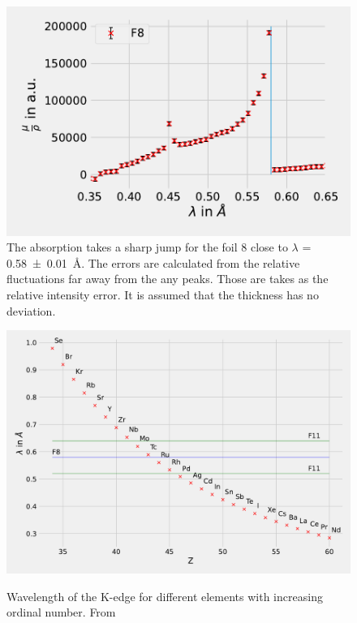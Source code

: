 \begin{figure}[h]
    \centering
    \includegraphics[width = 12cm]{Programming/Absorption/F8Kedge.pdf}
    \caption{The absorption takes a sharp jump for the foil 8 close to $\lambda$ = \SI{0.58\pm0.01}{\angstrom}. The errors are calculated from the  relative fluctuations far away from the any peaks. Those are takes as the relative intensity error. It is assumed that the thickness has no deviation.}
    \label{fig:F8edge}
\end{figure}


\begin{figure}[ht]
    \centering
    \includegraphics[angle = 90, width = 0.95\linewidth]{Programming/Absorption/Elements.pdf}
    \label{fig:Elements}
    \caption{Wavelength of the K-edge for different elements with increasing ordinal number. From \cite{XRayDatabase}}
\end{figure}


